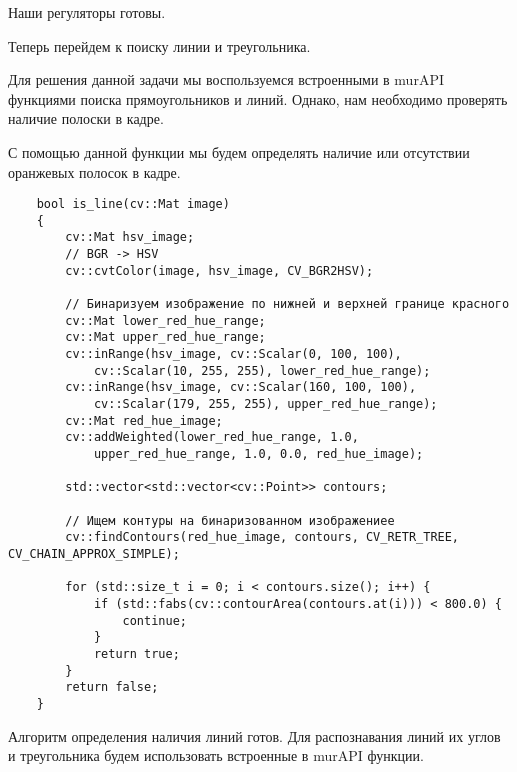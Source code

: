 Наши регуляторы готовы. 

Теперь перейдем к поиску линии и треугольника. 

Для решения данной задачи мы воспользуемся встроенными в murAPI функциями поиска прямоугольников и линий. Однако, нам необходимо проверять наличие полоски в кадре. 

С помощью данной функции мы будем определять наличие или отсутствии оранжевых полосок в кадре.

\begin{verbatim}
    bool is_line(cv::Mat image)
    {
        cv::Mat hsv_image;
        // BGR -> HSV
        cv::cvtColor(image, hsv_image, CV_BGR2HSV);
    
        // Бинаризуем изображение по нижней и верхней границе красного
        cv::Mat lower_red_hue_range;
        cv::Mat upper_red_hue_range;
        cv::inRange(hsv_image, cv::Scalar(0, 100, 100), 
            cv::Scalar(10, 255, 255), lower_red_hue_range);
        cv::inRange(hsv_image, cv::Scalar(160, 100, 100), 
            cv::Scalar(179, 255, 255), upper_red_hue_range);
        cv::Mat red_hue_image;
        cv::addWeighted(lower_red_hue_range, 1.0, 
            upper_red_hue_range, 1.0, 0.0, red_hue_image);
    
        std::vector<std::vector<cv::Point>> contours;
    
        // Ищем контуры на бинаризованном изображениее
        cv::findContours(red_hue_image, contours, CV_RETR_TREE, CV_CHAIN_APPROX_SIMPLE);
    
        for (std::size_t i = 0; i < contours.size(); i++) {
            if (std::fabs(cv::contourArea(contours.at(i))) < 800.0) {
                continue;
            }
            return true;
        }
        return false;
    }    
\end{verbatim}

Алгоритм определения наличия линий готов. Для распознавания линий их углов и треугольника будем использовать встроенные в murAPI функции.

